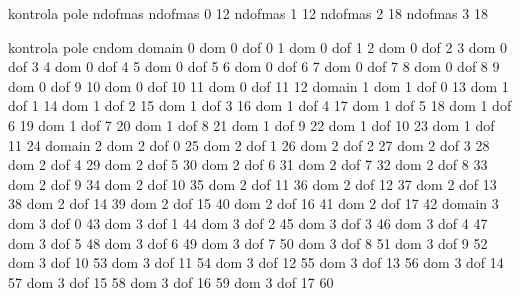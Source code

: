  kontrola pole ndofmas
 ndofmas      0       12
 ndofmas      1       12
 ndofmas      2       18
 ndofmas      3       18

 kontrola pole cndom
 domain 0
 dom      0  dof      0        1
 dom      0  dof      1        2
 dom      0  dof      2        3
 dom      0  dof      3        4
 dom      0  dof      4        5
 dom      0  dof      5        6
 dom      0  dof      6        7
 dom      0  dof      7        8
 dom      0  dof      8        9
 dom      0  dof      9       10
 dom      0  dof     10       11
 dom      0  dof     11       12
 domain 1
 dom      1  dof      0       13
 dom      1  dof      1       14
 dom      1  dof      2       15
 dom      1  dof      3       16
 dom      1  dof      4       17
 dom      1  dof      5       18
 dom      1  dof      6       19
 dom      1  dof      7       20
 dom      1  dof      8       21
 dom      1  dof      9       22
 dom      1  dof     10       23
 dom      1  dof     11       24
 domain 2
 dom      2  dof      0       25
 dom      2  dof      1       26
 dom      2  dof      2       27
 dom      2  dof      3       28
 dom      2  dof      4       29
 dom      2  dof      5       30
 dom      2  dof      6       31
 dom      2  dof      7       32
 dom      2  dof      8       33
 dom      2  dof      9       34
 dom      2  dof     10       35
 dom      2  dof     11       36
 dom      2  dof     12       37
 dom      2  dof     13       38
 dom      2  dof     14       39
 dom      2  dof     15       40
 dom      2  dof     16       41
 dom      2  dof     17       42
 domain 3
 dom      3  dof      0       43
 dom      3  dof      1       44
 dom      3  dof      2       45
 dom      3  dof      3       46
 dom      3  dof      4       47
 dom      3  dof      5       48
 dom      3  dof      6       49
 dom      3  dof      7       50
 dom      3  dof      8       51
 dom      3  dof      9       52
 dom      3  dof     10       53
 dom      3  dof     11       54
 dom      3  dof     12       55
 dom      3  dof     13       56
 dom      3  dof     14       57
 dom      3  dof     15       58
 dom      3  dof     16       59
 dom      3  dof     17       60
